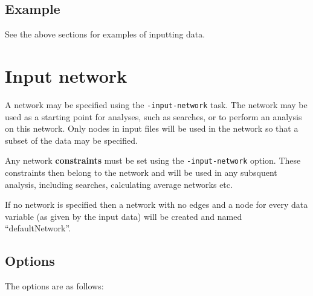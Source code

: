 \documentclass[a4paper,12pt]{article}
\newcommand{\code}[1]{{\footnotesize{{\tt #1}}}}
\begin{document}

\subsection{Example}
\label{input-data-example}

See the above sections for examples of inputting data. 




\section{Input network}
\label{input-network}

A network may be specified using the \code{-input-network} task. The network may be used as a starting point for analyses, such as searches, or to perform an analysis on this network. Only nodes in input files will be used in the network so that a subset of the data may be specified. 

Any network {\bf constraints} must be set using the \code{-input-network} option. These constraints then belong to the network and will be used in any subsquent analysis, including searches, calculating average networks etc. 

If no network is specified then a network with no edges and a node for every data variable (as given by the input data) will be created and named ``defaultNetwork''. 
\subsection{Options}
\label{input-network-options}

The options are as follows: 
\end{document}
